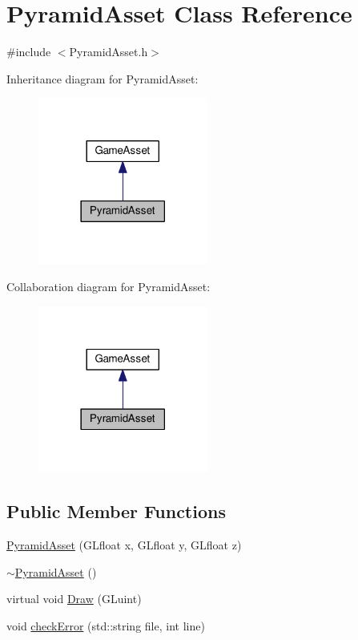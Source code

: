 \hypertarget{classPyramidAsset}{}\section{Pyramid\+Asset Class Reference}
\label{classPyramidAsset}


{\ttfamily \#include $<$Pyramid\+Asset.\+h$>$}



Inheritance diagram for Pyramid\+Asset\+:\nopagebreak
\begin{figure}[H]
\begin{center}
\leavevmode
\includegraphics[width=158pt]{classPyramidAsset__inherit__graph}
\end{center}
\end{figure}


Collaboration diagram for Pyramid\+Asset\+:\nopagebreak
\begin{figure}[H]
\begin{center}
\leavevmode
\includegraphics[width=158pt]{classPyramidAsset__coll__graph}
\end{center}
\end{figure}
\subsection*{Public Member Functions}
\begin{DoxyCompactItemize}
\item 
\hyperlink{classPyramidAsset_a3f7c6fd658ed0d3e276d7fe6c1de95d1}{Pyramid\+Asset} (G\+Lfloat x, G\+Lfloat y, G\+Lfloat z)
\item 
\hyperlink{classPyramidAsset_afb388a196f43a3808b2d4f6fdb89ee84}{$\sim$\+Pyramid\+Asset} ()
\item 
virtual void \hyperlink{classPyramidAsset_aaea45da4956d79ec9ab96e9d0ccef3fe}{Draw} (G\+Luint)
\item 
void \hyperlink{classPyramidAsset_a34350044042e0098446dc9e0a260cb70}{check\+Error} (std\+::string file, int line)
\end{DoxyCompactItemize}


